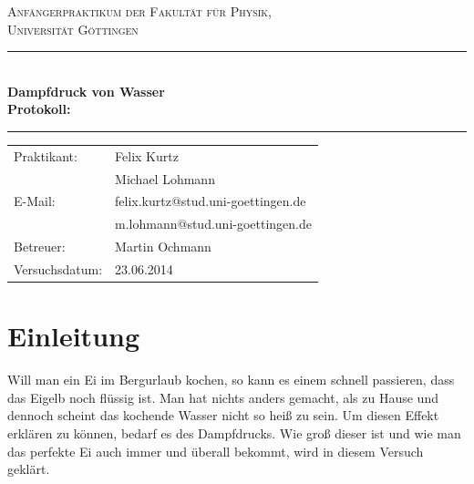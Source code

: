 \documentclass[12pt,a4paper,titlepage,headinclude,bibtotoc]{scrartcl}
\begin{document}
\begin{titlepage}
\centering
\textsc{\Large Anfängerpraktikum der Fakultät für
  Physik,\\[1.5ex] Universität Göttingen}

\vspace*{4.2cm}

\rule{\textwidth}{1pt}\\[0.5cm]
{\huge \bfseries
  Dampfdruck von Wasser\\[1.5ex]
  Protokoll:}\\[0.5cm]
\rule{\textwidth}{1pt}

\vspace*{3.0cm}

\begin{Large}
\begin{tabular}{ll}
Praktikant:
 	&  Felix Kurtz\\
 	&  Michael Lohmann\\

  E-Mail: 
	&  felix.kurtz@stud.uni-goettingen.de\\
	& m.lohmann@stud.uni-goettingen.de\\	

 Betreuer: & Martin Ochmann\\
 Versuchsdatum: & 23.06.2014\\
\end{tabular}
\end{Large}

\vspace*{0.8cm}

\begin{Large}
\end{Large}

\end{titlepage}

\tableofcontents

\newpage

\section{Einleitung}
\label{sec:einleitung}
Will man ein Ei im Bergurlaub kochen, so kann es einem schnell passieren, dass das Eigelb noch flüssig ist.
Man hat nichts anders gemacht, als zu Hause und dennoch scheint das kochende Wasser nicht so heiß zu sein.
Um diesen Effekt erklären zu können, bedarf es des Dampfdrucks.
Wie groß dieser ist und wie man das perfekte Ei auch immer und überall bekommt, wird in diesem Versuch geklärt.
\end{document}
